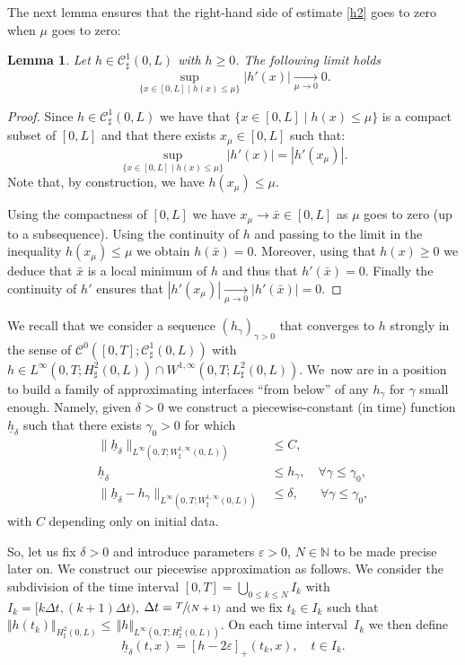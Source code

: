 \documentclass[JEP,XML,SOM,Unicode,NoFloatCountersInSection]{cedram}
\let\mathcal\mathscr
\newcommand{\spfrac}[2]{\sfrac{#1}{(#2)}}
\newtheorem{lemma}[theorem]{Lemma}
\theoremstyle{remark}
\theoremstyle{definition}
\newcommand{\norme}[1]{\,\Vert #1\Vert}
\newcommand{\vnorme}[1]{\Vert #1\Vert}
\newcommand{\hb}{{\underline{h}}}
\begin{document}
The next lemma ensures that the right-hand side of estimate \eqref{h2} goes to zero when $\mu$ goes to zero:
\begin{lemma}\label{lemma.conv.zero}Let $h \in \mathcal{C}_\sharp^{1}(0,L)$ with $h\geq 0$. The following limit holds
\[\sup_{\{x\in [0, L]\mid h(x)\leq\mu\}}\vert h'(x)\vert \underset{\mu\to 0}{\to} 0.
\]
\end{lemma}
\begin{proof}Since $ h \in \mathcal{C}^1_\sharp(0,L)$ we have that $\{ x \in [0,L]\mid h(x)\leq\mu\}$ is a compact subset of $[0,L]$ and that there exists $x_{\mu}\in [0,L]$ such that:
\[
\sup_{\{x\in [0, L]\mid h(x)\leq\mu\}} |h'(x)|= |h'(x_{\mu})|.
\]
Note that, by construction, we have $h(x_{\mu})\leq \mu$.

Using the compactness of $[0,L]$ we have $x_{\mu}\to \bar x\in [0,L]$ as $\mu$ goes to zero (up to a subsequence). Using the continuity of $h$ and passing to the limit in the inequality $h(x_{\mu})\leq \mu$ we obtain $h(\bar x)=0$. Moreover, using that $h(x)\geq 0$ we deduce that $\bar x$ is a local minimum of $h$ and thus that $h'(\bar x)=0$. Finally the continuity of $h'$ ensures that $|h'(x_{\mu})|\underset{\mu\to 0}{\to}|h'(\bar x)|=0$.
\end{proof}

We recall that we consider a sequence $(h_{\gamma})_{\gamma >0}$
that converges to $h$ strongly in the sense of $\mathcal{C}^{0}([0,T];\mathcal{C}_\sharp^{1}(0,L))$ with $h\in L^{\infty}(0,T;H_\sharp^{2}(0,L)) \cap W^{1,\infty}(0, T; L^2_\sharp(0, L))$.
We~now are in a position to build a family of approximating interfaces ``from below'' of any $h_\gamma$ for $\gamma$ small enough. Namely, given $\delta >0$ we construct a piecewise-constant (in time) function $\underline{h}_{\delta}$
such that there exists $\gamma_0 >0$ for which
\begin{align}
\|\hb_{\delta}\|_{L^{\infty}(0,T;W^{1,\infty}_{\sharp}(0,L))} &\leq C, \label{estimate.hb}\\
\hb_{\delta}&\leq h_{\gamma}, \quad\forall \gamma\leq\gamma_{0}, \label{eq.interfacebelow}\\
\| \hb_{\delta}- h_\gamma\|_{L^\infty(0,T; W_\sharp^{1, \infty}(0, L))}&\leq \delta, \;\;\,\quad\forall \gamma\leq\gamma_{0}, \label{estimation-diffth}
\end{align}
with $C$ depending only on initial data.

So, let us fix $\delta >0$ and introduce parameters $\varepsilon >0$, $N\in \mathbb N$ to be made precise later on.
We construct our piecewise approximation as follows. We consider the subdivision of the time interval $[0,T]=\bigcup_{0\leq k\leq N}I_{k}$ with $I_{k}=[k\Delta t,(k+1)\Delta t)$, $\Delta t=\spfrac{T}{N+1}$ and we fix $t_{k}\in I_{k}$ such that $\vnorme{h(t_{k})}_{H^{2}_{\sharp}(0,L)}\leq \norme{h}_{L^{\infty}(0,T;H^{2}_{\sharp}(0,L))}$. On each time interval~$I_k$ we then define
\begin{equation}
\label{def-sous-h}
\hb_{\delta}(t, x)= [h-2\varepsilon]_+(t_{k},x), \quad t\in I_k.
\end{equation}
\end{document}
